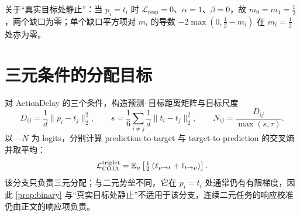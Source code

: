 \documentclass[UTF8,zihao=-4,fontset=fandol]{ctexart}
\newcommand{\method}{\textsc{COJA}}
\begin{document}
关于“真实目标处静止”：当 $p_i=t_i$ 时 $\mathcal{L}_{\mathrm{resp}}=0$、$\alpha=1$、$\beta=0$，故 $m_0=m_1=\tfrac12$，两个缺口为零；单个缺口平方项对 $m_i$ 的导数 $-2\max(0,\tfrac12-m_i)$ 在 $m_i=\tfrac12$ 处亦为零。

\section{三元条件的分配目标}
\label{app:triplet}

对 ActionDelay 的三个条件，构造预测--目标距离矩阵与目标尺度
\begin{equation}
  D_{ij}=\frac{1}{d}\lVert p_i-t_j\rVert_2^2,\qquad
  s=\frac{1}{6}\sum_{i\neq j}\frac{1}{d}\lVert t_i-t_j\rVert_2^2,\qquad
  N_{ij}=\frac{D_{ij}}{\max(s,\tau)} .
\end{equation}
以 $-N$ 为 logits，分别计算 prediction-to-target 与 target-to-prediction 的交叉熵并取平均：
\begin{equation}
  \mathcal{L}_{\method}^{\mathrm{triplet}}
  =\mathbb{E}_g\left[\tfrac12\left(\ell_{p\to t}+\ell_{t\to p}\right)\right].
\end{equation}
该分支只负责三元分配；与二元势垒不同，它在 $p_i=t_i$ 处通常仍有有限梯度，因此 \cref{prop:binary} 与“真实目标处静止”不适用于该分支，连续二元任务的响应校准仍由正文的响应项负责。
\end{document}
